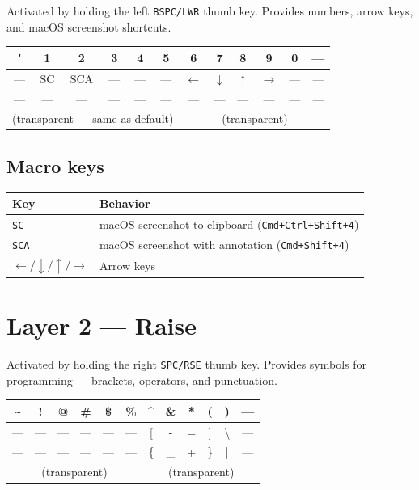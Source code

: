 \documentclass[11pt, letterpaper]{article}
\begin{document}
Activated by holding the left \texttt{BSPC/LWR} thumb key. Provides
numbers, arrow keys, and macOS screenshot shortcuts.

\begin{center}
\renewcommand{\arraystretch}{1.4}
\begin{tabular}{|c|c|c|c|c|c||c|c|c|c|c|c|}
\hline
\texttt{`} & 1 & 2 & 3 & 4 & 5 & 6 & 7 & 8 & 9 & 0 & --- \\
\hline
--- & SC & SCA & --- & --- & --- & $\leftarrow$ & $\downarrow$ & $\uparrow$ & $\rightarrow$ & --- & --- \\
\hline
--- & --- & --- & --- & --- & --- & --- & --- & --- & --- & --- & --- \\
\hline
\multicolumn{6}{|c|}{(transparent — same as default)} &
\multicolumn{6}{c|}{(transparent)} \\
\hline
\end{tabular}
\end{center}

\subsection*{Macro keys}

\begin{tabular}{lp{9cm}}
\toprule
\textbf{Key} & \textbf{Behavior} \\
\midrule
\texttt{SC}  & macOS screenshot to clipboard (\texttt{Cmd+Ctrl+Shift+4}) \\
\texttt{SCA} & macOS screenshot with annotation (\texttt{Cmd+Shift+4}) \\
$\leftarrow / \downarrow / \uparrow / \rightarrow$ & Arrow keys \\
\bottomrule
\end{tabular}

\section{Layer 2 — Raise}

Activated by holding the right \texttt{SPC/RSE} thumb key. Provides
symbols for programming — brackets, operators, and punctuation.

\begin{center}
\renewcommand{\arraystretch}{1.4}
\begin{tabular}{|c|c|c|c|c|c||c|c|c|c|c|c|}
\hline
\texttt{\~{}} & ! & @ & \# & \$ & \% & \^{} & \& & * & ( & ) & --- \\
\hline
--- & --- & --- & --- & --- & --- & [ & - & = & ] & \textbackslash & --- \\
\hline
--- & --- & --- & --- & --- & --- & \{ & \_ & + & \} & | & --- \\
\hline
\multicolumn{6}{|c|}{(transparent)} &
\multicolumn{6}{c|}{(transparent)} \\
\hline
\end{tabular}
\end{center}
\end{document}
